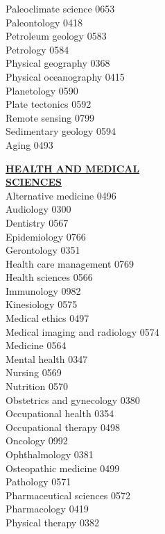 \documentclass[9pt,twoside]{article}
\newcommand{\categoryheading}[1]{{\fontsize{8}{11}\selectfont \textbf{\uline{#1}}}}
\begin{document}
\begin{multicols}{3}
Paleoclimate science \hfill 0653 \\
Paleontology \hfill 0418 \\
Petroleum geology \hfill 0583 \\
Petrology \hfill 0584 \\
Physical geography \hfill 0368 \\
Physical oceanography \hfill 0415 \\
Planetology \hfill 0590 \\
Plate tectonics \hfill 0592 \\
Remote sensing \hfill 0799 \\
Sedimentary geology \hfill 0594 \\
Aging \hfill 0493

\categoryheading{HEALTH AND MEDICAL \\
SCIENCES} \\
Alternative medicine \hfill 0496 \\
Audiology \hfill 0300 \\
Dentistry \hfill 0567 \\
Epidemiology \hfill 0766 \\
Gerontology \hfill 0351 \\
Health care management \hfill 0769 \\
Health sciences \hfill 0566 \\
Immunology \hfill 0982 \\
Kinesiology \hfill 0575 \\
Medical ethics \hfill 0497 \\
Medical imaging and radiology \hfill 0574 \\
Medicine \hfill 0564 \\
Mental health \hfill 0347 \\
Nursing \hfill 0569 \\
Nutrition \hfill 0570 \\
Obstetrics and gynecology \hfill 0380 \\
Occupational health \hfill 0354 \\
Occupational therapy \hfill 0498 \\
Oncology \hfill 0992 \\
Ophthalmology \hfill 0381 \\
Osteopathic medicine \hfill 0499 \\
Pathology \hfill 0571 \\
Pharmaceutical sciences \hfill 0572 \\
Pharmacology \hfill 0419 \\
Physical therapy \hfill 0382 \\

\end{multicols}
\end{document}

